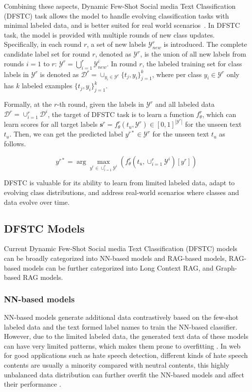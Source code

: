Combining these aspects, Dynamic Few-Shot Social media Text Classification (DFSTC) task allows the model to handle evolving classification tasks with minimal labeled data, and is better suited for real world scenarios~\cite{xia-etal-2021-incremental}.
In DFSTC task, the model is provided with multiple rounds of new class updates.
Specifically, in each round $r$, a set of new labels $\mathcal{Y}^r_{new}$ is introduced. The complete candidate label set for round $r$, denoted as $\mathcal{Y}^r$, is the union of all new labels from rounds $i = 1$ to $r$: $\mathcal{Y}^r = \bigcup_{i=1}^r \mathcal{Y}^i_{new}$.
 In round $r$, the labeled training set for class labels in $\mathcal{Y}^r$ 
 is denoted as $\mathcal{D}^r=\cup_{y_i \in \mathcal{Y}^r}\{t_j,y_i\}_{j=1}^k$, 
 where per class $y_i \in \mathcal{Y}^r$ only has $k$ labeled examples $\{t_j,y_i\}_{j=1}^k$.
 
Formally, at the $r$-th round, given the labels in $\mathcal{Y}^r$ and all labeled data $\mathcal{D}^r=\cup_{i=1}^r\mathcal{D}^i$,
the target of DFSTC task is to learn a function $f^r_\theta$, which can learn scores for all target labels $\mathbf{s}^r={f}^r_\theta(t_u,\mathcal{Y}^r)\in[0,1]^{|\mathcal{Y}^r|}$ for the unseen text $t_u$.
Then, we can get the predicted label $y^{r*}\in \mathcal{Y}^r$ for the unseen text $t_u$ as follows.  



\begin{equation}
	y^{r*}=\arg\max_{y^r \in \cup_{i=1}^r \mathcal{Y}^i}({f}_\theta^r(t_u, \cup_{i=1}^r \mathcal{Y}^i)[y^r])
\end{equation}

DFSTC is valuable for its ability to learn from limited labeled data, adapt to evolving class distributions, 
and address real-world scenarios where classes and data evolve over time.

\subsection{DFSTC Models}\label{sec:related_work}
Current Dynamic Few-Shot Social media Text Classification (DFSTC) models can be broadly categorized into 
NN-based models and RAG-based models, RAG-based models can be further categorized into Long Context RAG, and Graph-based RAG models. 

\subsubsection{\textbf{NN-based models}}
NN-based models \cite{meng2018weakly,meng2020text,xia-etal-2021-incremental} generate additional data contrastively based on the few-shot labeled data and the text formed label names to train the NN-based classifier. 
However, due to the limited labeled data, the generated text data of these models can have very limited patterns, which makes them prone to overfitting \cite{liu2023pre,liu2024liberating,lei2023tart}. 
In web for good applications such as hate speech detection, different kinds of hate speech contents are usually a minority compared with neutral contents, this highly unbalanced data distribution can further overfit the NN-based models and affect their performance \cite{liu2023pre}.



